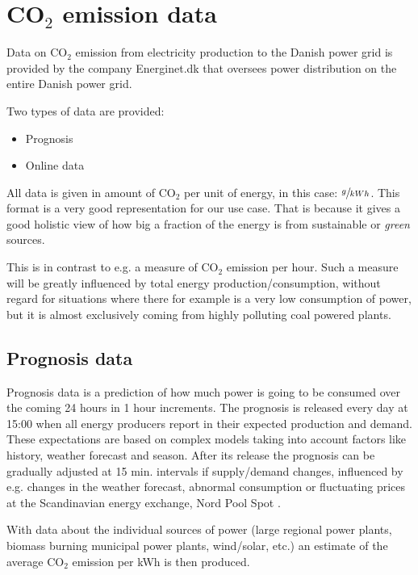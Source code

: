 \documentclass[Main]{subfiles}
\begin{document}
\section{CO$_2$ emission data} %
\label{sub:c02_emission_data}

	Data on CO$_2$ emission from electricity production to the Danish power grid is provided by the company Energinet.dk that oversees power distribution on the entire Danish power grid.

	Two types of data are provided:
	\begin{itemize}
		\item Prognosis \cite{EnerginetFTPPrognosis:Online}
		\item Online data \cite{EnerginetFTPOnline:Online}
	\end{itemize}

	All data is given in amount of CO$_2$ per unit of energy, in this case: 
	$\sfrac{g}{kWh}$.
	This format is a very good representation for our use case.
	That is because it gives a good holistic view of how big a fraction of the energy is from sustainable or \emph{green} sources.
	
	This is in contrast to e.g. a measure of CO$_2$ emission per hour.
	Such a measure will be greatly influenced by total energy production/consumption, without regard for situations where there for example is a very low consumption of power, but it is almost exclusively coming from highly polluting coal powered plants.

	\subsection{Prognosis data} %
	\label{sub:prognosis}
		Prognosis data is a prediction of how much power is going to be consumed over the coming 24 hours in 1 hour increments.
		The prognosis is released every day at 15:00 when all energy producers report in their expected production and demand.
		These expectations are based on complex models taking into account factors like history, weather forecast and season.
		After its release the prognosis can be gradually adjusted at 15 min. intervals if supply/demand changes, influenced by e.g. changes in the weather forecast, abnormal consumption or fluctuating prices at the Scandinavian energy exchange, Nord Pool Spot \cite{NordPool:Online}.

		With data about the individual sources of power (large regional power plants, biomass burning municipal power plants, wind/solar, etc.) an estimate of the average CO$_2$ emission per kWh is then produced.
\end{document}
